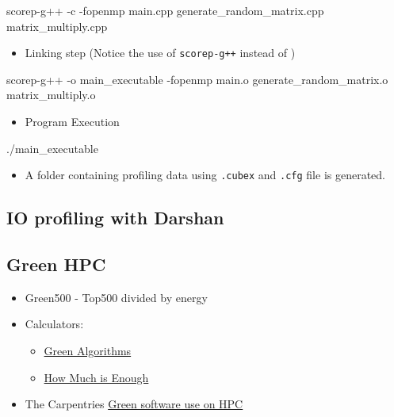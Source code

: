 \documentclass[
  letterpaper,
  DIV=11,
  numbers=noendperiod]{scrartcl}
\newenvironment{Shaded}{\begin{snugshade}}{\end{snugshade}}
\newcommand{\AttributeTok}[1]{\textcolor[rgb]{0.40,0.45,0.13}{#1}}
\newcommand{\ExtensionTok}[1]{\textcolor[rgb]{0.00,0.23,0.31}{#1}}
\newcommand{\NormalTok}[1]{\textcolor[rgb]{0.00,0.23,0.31}{#1}}
\providecommand{\tightlist}{%
  \setlength{\itemsep}{0pt}\setlength{\parskip}{0pt}}
\begin{document}
\begin{Shaded}
\begin{Highlighting}[]
\ExtensionTok{scorep{-}g++} \AttributeTok{{-}c} \AttributeTok{{-}fopenmp}\NormalTok{ main.cpp generate\_random\_matrix.cpp matrix\_multiply.cpp}
\end{Highlighting}
\end{Shaded}

\begin{itemize}
\tightlist
\item
  Linking step (Notice the use of \texttt{scorep-g++} instead of
  )
\end{itemize}

\begin{Shaded}
\begin{Highlighting}[]
\ExtensionTok{scorep{-}g++} \AttributeTok{{-}o}\NormalTok{ main\_executable }\AttributeTok{{-}fopenmp}\NormalTok{ main.o generate\_random\_matrix.o matrix\_multiply.o}
\end{Highlighting}
\end{Shaded}

\begin{itemize}
\tightlist
\item
  Program Execution
\end{itemize}

\begin{Shaded}
\begin{Highlighting}[]
\ExtensionTok{./main\_executable}
\end{Highlighting}
\end{Shaded}

\begin{itemize}
\tightlist
\item
  A folder containing profiling data using \texttt{.cubex} and
  \texttt{.cfg} file is generated.
\end{itemize}

\subsection{IO profiling with Darshan}\label{io-profiling-with-darshan}

\subsection{Green HPC}\label{green-hpc}

\begin{itemize}
\tightlist
\item
  Green500 - Top500 divided by energy
\item
  Calculators:

  \begin{itemize}
  \tightlist
  \item
    \href{https://www.green-algorithms.org/}{Green Algorithms}
  \item
    \href{https://chryswoods.github.io/howmuchisenough/}{How Much is
    Enough}
  \end{itemize}
\item
  The Carpentries
  \href{https://carpentries-incubator.github.io/green-software-hpc/index.html}{Green
  software use on HPC}
\end{itemize}
\end{document}
